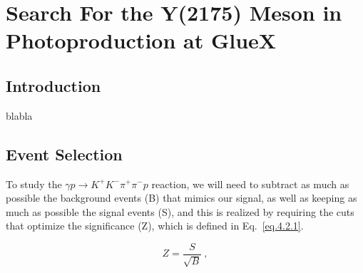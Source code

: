 \section{Search For the Y(2175) Meson in Photoproduction at GlueX}
\label{p.4}

\subsection{Introduction}
\label{p.4.1}

blabla

\subsection{Event Selection}
\label{p.4.2}

To study the $\gamma p \rightarrow  K^+ K^- \pi^+ \pi^- p$ reaction, we will need to subtract as much as possible the background events (B) that mimics our signal, as well as keeping as much as possible the signal events (S), and this is realized by requiring the cuts that optimize the significance (Z), which is defined in Eq.~\ref{eq.4.2.1}.

\begin{equation}
    \label{eq.4.2.1}
    Z = \frac{S}{\sqrt{B}}~,
\end{equation}

